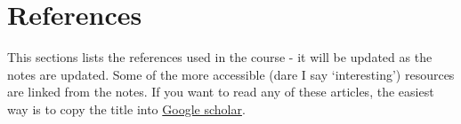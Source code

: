 \documentclass[
  openany]{book}
\theoremstyle{definition}
\theoremstyle{definition}
\theoremstyle{definition}
\theoremstyle{definition}
\theoremstyle{remark}
\begin{document}
\hypertarget{references}{%
\chapter*{References}\label{references}}

This sections lists the references used in the course - it will be updated as the notes are updated. Some of the more accessible (dare I say `interesting') resources are linked from the notes. If you want to read any of these articles, the easiest way is to copy the title into \href{https://scholar.google.co.uk/}{Google scholar}.

  
\end{document}
